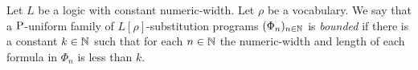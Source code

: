 \documentclass[../main/thesis.tex]{subfiles}
\begin{document}


Let $L$ be a logic with constant numeric-width. Let $\rho$ be a vocabulary. We
say that a $\mathrm{P}$-uniform family of $L[\rho]$-substitution programs $(\Phi_n)_{n
  \in \mathbb{N}}$ is \emph{bounded} if there is a constant $k \in \mathbb{N}$ such that
for each $n \in \mathbb{N}$ the numeric-width and length of each formula in $\Phi_n$
is less than $k$.
\end{document}
